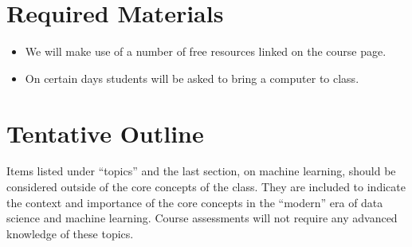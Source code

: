 \documentclass[11pt]{article}
\begin{document}


\section*{Required Materials}

\begin{itemize}
\item We will make use of a number of free resources linked on the course page.
\item On certain days students will be asked to bring a computer to class. 
\end{itemize}



\section*{Tentative Outline}

Items listed under ``topics'' and the last section, on machine learning, should be considered outside of the core concepts of the class. They are included to indicate the context and importance of the core concepts in the ``modern'' era of data science and machine learning. Course assessments will not require any advanced knowledge of these topics.
\end{document}
